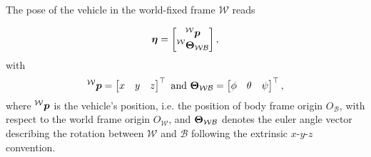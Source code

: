 The pose of the vehicle in the world-fixed frame $\mathcal{W}$ reads

\begin{equation}
	\etab = 
	\begin{bmatrix}
		\prescript{\mathcal{W}}{}{\pbo} \\
		\prescript{\mathcal{W}}{}{\Theb_{\mathcal{W}\mathcal{B}}}
	\end{bmatrix}
	,
\end{equation}
with
\begin{equation}
	\prescript{\mathcal{W}}{}{\mbox{$\bm{p}$}} = 
	\begin{bmatrix}
		x & y & z
	\end{bmatrix}^\top
	\text{ and }
	\mbox{$\bm{\Theta}$}_{\mathcal{W}\mathcal{B}} =
	\begin{bmatrix}
		\phi & \theta & \psi
	\end{bmatrix}^\top,
\end{equation}
where $\prescript{\mathcal{W}}{}{\mbox{$\bm{p}$}}$ is the vehicle's position, i.e. the position of body frame origin $O_\mathcal{B}$, with respect to the world frame origin $O_\mathcal{W}$, and $\mbox{$\bm{\Theta}$}_{\mathcal{W}\mathcal{B}}$ denotes the euler angle vector describing the rotation between $\mathcal{W}$ and $\mathcal{B}$ following the extrinsic $x$-$y$-$z$ convention.

